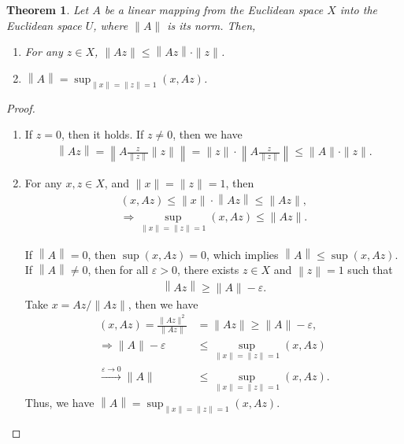 \documentclass[10pt]{book}
\newtheorem{theorem}{Theorem}[chapter]
\theoremstyle{definition}
\numberwithin{equation}{chapter}
\begin{document}
\begin{theorem}
Let $A$ be a linear mapping from the Euclidean space $X$ into the
Euclidean space $U$, where $\|A\|$ is its norm. Then, 
\begin{enumerate}[label=(\alph*)]
    \item For any $z\in X$, $\|Az\|\leq \left\|Az\right\|\cdot \|z\|$.
    \item $\left\|A\right\| = \sup_{\|x\| = \|z\| = 1} (x, Az)$.
\end{enumerate}
\end{theorem}
\begin{proof}
~\begin{enumerate}[label=(\alph*)]
    \item If $z = 0$, then it holds. If $z\neq 0$, then we have 
    \begin{align*}
        \left\|Az\right\| = \left\|A \frac{z}{\|z\|}\|z\|\right\| = \|z\|\cdot \left\|A \frac{z}{\|z\|}\right\| \leq \|A\|\cdot \|z\|.
    \end{align*}
    \item For any $x,z\in X$, and $\|x\| = \|z\| = 1$, then 
    \begin{align*}
        (x, Az) \leq \|x\| \cdot \left\|Az\right\| \leq \|Az\|, \\
        \Rightarrow \sup_{\|x\| = \|z\| = 1} (x, Az) \leq \|Az\|.
    \end{align*}
    
    If $\left\|A\right\| = 0$, then $\sup (x, Az) = 0$, which implies $\left\|A\right\| \leq \sup (x, Az)$. If $\left\|A\right\| \neq 0$, then for all $\varepsilon > 0$, there exists $z \in X$ and $\left\|z\right\| = 1$ such that 
    \begin{align*}
        \left\|Az\right\| \geq \|A\| - \varepsilon.
    \end{align*}
    Take $x = Az/ \|Az\|$, then we have 
    \begin{align*}
        (x, Az) = \frac{\|Az\|^2}{\|Az\|} & = \|Az\| \geq \|A\| - \varepsilon, \\
        \Rightarrow \|A\| - \varepsilon & \leq \sup_{\|x\| = \|z\| = 1} (x, Az) \\
        \xrightarrow{\varepsilon \to 0} \|A\| & \leq \sup_{\|x\| = \|z\| = 1} (x, Az).
    \end{align*}
    Thus, we have $\left\|A\right\| = \sup_{\|x\| = \|z\| = 1} (x, Az)$.
\end{enumerate}
\end{proof}
\end{document}

